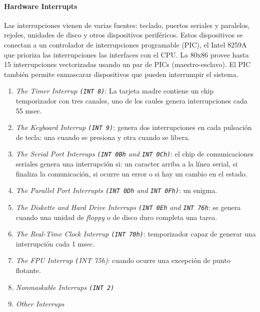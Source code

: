 \paragraph{\textnormal{\textbf{Hardware Interrupts}}}
Las interrupciones vienen de varias fuentes: teclado, puertos seriales y paralelos, rejoles, unidades de disco y otros dispositivos periféricos. Estos dispositivos se conectan a un controlador de interrupciones programable (PIC), el Intel 8259A  que prioriza las interrupciones las interfaces con el CPU. La 80x86 provee hasta 15 interrupciones vectorizadas usando un par de PICs (maestro-esclavo). El PIC también permite enmascarar dispositivos que pueden interrumpir el sistema. 


\begin{enumerate}
    \item \textit{The Timer Interrup \texttt{(INT 8)}}: La tarjeta madre contiene un chip temporizador con tres canales, uno de los caules genera interrupciones cada 55 msec.
    \item \textit{The Keyboard Interrup \texttt{(INT 9)}}: genera dos interrupciones en cada pulsación de tecla: una cuando se presiona y otra cuando se libera.
    \item \textit{The Serial Port Interrups \texttt{(INT 0Bh} and \texttt{INT 0Ch)}}: el chip de comunicaciones seriales genera una interrupción si: un caracter arriba a la línea serial, si finaliza la comunicación, si ocurre un error o si hay un cambio en el estado.
    \item \textit{The Parallel Port Interrupts \texttt{(INT 0Dh} and \texttt{INT 0Fh)}}: un enigma.
    \item \textit{The Diskette and Hard Drive Interrups \texttt{(INT 0Eh} and \texttt{INT 76h}}: se genera cuando una unidad de \textit{floppy} o de disco duro completa una tarea.
    \item \textit{The Real-Time Clock Interrup \texttt{(INT 70h)}}: temporizador capaz de generar una interrupción cada 1 msec.
    \item \textit{The FPU Interrup \texttt(INT 75h)}: cuando ocurre una excepción de punto flotante.
    \item \textit{Nonmaskable Interrups \texttt{(INT 2)}}
    \item \textit{Other Interrups}
\end{enumerate}

